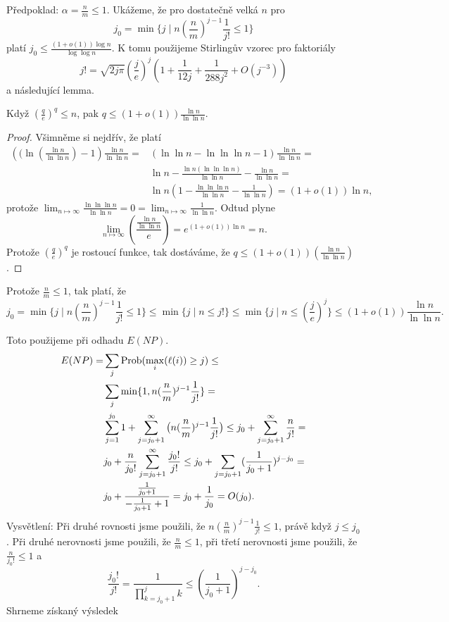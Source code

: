 \documentclass[a4paper,12pt]{article}
\begin{document}
Předpoklad: $\alpha =\frac nm\le 1$. Ukážeme, že pro dostatečně 
velká $n$ pro 
$$j_0=\min\{j\mid n(\frac nm)^{j-1}\frac 1{j!}\le 1\}$$
platí $j_0\le\frac {(1+o(1))\log n}{\log\log n}$. 
K tomu použijeme Stirlingův vzorec pro faktoriály
$$j!=\sqrt{2j\pi}\left(\frac je\right)^j\left(1+\frac 1{12j}+\frac 1{288j^2}+O(j^{-3})\right)$$
a následující lemma.

\begin{lemma}Když $(\frac qe)^q\le n$, pak $q\le(1+o(1))\frac{\ln n}{\ln\ln n}$.
\end{lemma}

\begin{proof}Všimněme si nejdřív, že platí
\begin{align*}\left((\ln(\frac{\ln n}{\ln\ln n})-1\right)\frac{\ln n}{\ln\ln n}=&(\ln\ln n-\ln\ln\ln n-1)\frac{\ln n}{\ln\ln n}=\\&
\ln n-\frac{\ln n(\ln\ln\ln n)}{\ln\ln n}-\frac{\ln n}{\ln\ln n}=\\&\ln n(1-\frac{\ln\ln\ln n}{\ln\ln n}-
\frac 1{\ln\ln n})=(1+o(1))\ln n,\end{align*}
protože $\lim_{n\mapsto\infty}\frac{\ln\ln\ln n}{\ln\ln n}=0=\lim_{n\mapsto\infty}\frac 1{\ln\ln n}$. 
Odtud plyne $$\lim_{n\mapsto\infty}\left(\frac{\frac{\ln n}{\ln\ln n}}e\right)=e^{(1+o(1))\ln n}=n.$$ Protože $(\frac qe)^q$ je rostoucí funkce, tak dostáváme, že $q\le(1+o(1))(\frac{\ln n}{\ln\ln n})$.
\end{proof}

Protože $\frac nm\le1$, tak platí, že 
$$j_0=\min\{j\mid n(\frac nm)^{j-1}\frac 1{j!}\le 1\}\le\min\{j\mid n\le j!\}\le\min\{j\mid n\le
(\frac je)^j\}\le(1+o(1))\frac{\ln n}{\ln\ln n}.$$ 

Toto použijeme při odhadu $E(NP)$.
\begin{align*} E(NP)=&\sum_j\operatorname{Prob}(\max_i(\ell (i))\ge j)\le\\
&\sum_j\min\{1,n(\frac nm)^{j-1}\frac 1{j!}\}=\\
&\sum_{j=1}^{j_0}1+\sum_{j=j_0+1}^{\infty}\big(n(\frac nm)^{j-1}\frac 
1{j!}\big)\le j_0+\sum_{j=j_0+1}^{\infty}\frac n{j!}=\\
&j_0+\frac n{j_0!}\sum_{j=j_0+1}^{\infty}\frac {j_0!}{j!}\le j_0+
\sum_{j=j_0+1}(\frac 1{j_0+1})^{j-j_0}=\\
&j_0+\frac {\frac 1{j_0+1}}{-\frac 1{j_0+1}+1}=j_0+\frac 1{j_0}=O
(j_0).\end{align*}
Vysvětlení: Při druhé rovnosti jsme použili, že $n(\frac nm)^{j-1}\frac 1{j!}\le 1$, právě když $j\le j_0$. Při druhé nerovnosti jsme použili, že $\frac 
nm\le 1$, 
při třetí nerovnosti jsme použili, že $\frac n{j_
0!}\le 1$ a 
$$\frac {j_0!}{j!}=\frac 1{\prod_{k=j_0+1}^jk}\le (\frac 1{j_0+
1})^{j-j_0}.$$
Shrneme získaný výsledek
\end{document}
